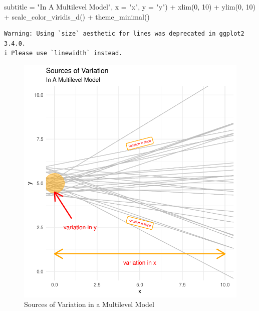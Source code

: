 \documentclass[
  letterpaper,
  DIV=11,
  numbers=noendperiod]{scrreprt}
\newenvironment{Shaded}{\begin{snugshade}}{\end{snugshade}}
\newcommand{\AttributeTok}[1]{\textcolor[rgb]{0.40,0.45,0.13}{#1}}
\newcommand{\DecValTok}[1]{\textcolor[rgb]{0.68,0.00,0.00}{#1}}
\newcommand{\FunctionTok}[1]{\textcolor[rgb]{0.28,0.35,0.67}{#1}}
\newcommand{\NormalTok}[1]{\textcolor[rgb]{0.00,0.23,0.31}{#1}}
\newcommand{\SpecialCharTok}[1]{\textcolor[rgb]{0.37,0.37,0.37}{#1}}
\newcommand{\StringTok}[1]{\textcolor[rgb]{0.13,0.47,0.30}{#1}}
\begin{document}
\begin{Shaded}
\begin{Highlighting}[]
       \AttributeTok{subtitle =} \StringTok{"In A Multilevel Model"}\NormalTok{,}
       \AttributeTok{x =} \StringTok{"x"}\NormalTok{,}
       \AttributeTok{y =} \StringTok{"y"}\NormalTok{) }\SpecialCharTok{+}
  \FunctionTok{xlim}\NormalTok{(}\DecValTok{0}\NormalTok{, }\DecValTok{10}\NormalTok{) }\SpecialCharTok{+}
  \FunctionTok{ylim}\NormalTok{(}\DecValTok{0}\NormalTok{, }\DecValTok{10}\NormalTok{) }\SpecialCharTok{+}
  \FunctionTok{scale\_color\_viridis\_d}\NormalTok{() }\SpecialCharTok{+}
  \FunctionTok{theme\_minimal}\NormalTok{() }
\end{Highlighting}
\end{Shaded}

\begin{verbatim}
Warning: Using `size` aesthetic for lines was deprecated in ggplot2 3.4.0.
i Please use `linewidth` instead.
\end{verbatim}

\begin{figure}[H]

{\centering \includegraphics{./cross-sectional_files/figure-pdf/fig-variationsources-1.pdf}

}

\caption{\label{fig-variationsources}Sources of Variation in a
Multilevel Model}

\end{figure}
\end{document}
